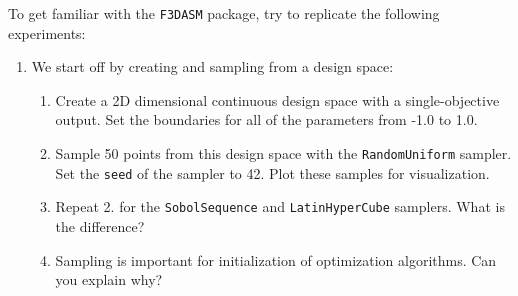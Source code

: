 \documentclass[10pt,a4paper,twoside]{article} %
\def\code#1{\texttt{#1}}
\begin{document}
To get familiar with the \code{F3DASM} package, try to replicate the following experiments:

\begin{enumerate}
	\setcounter{enumi}{0}
	\item We start off by creating and sampling from a design space:

	\begin{enumerate} [label*=\arabic*.]
		\item Create a 2D dimensional continuous design space with a single-objective output. Set the boundaries for all of the parameters from -1.0 to 1.0.
		
		\item Sample 50 points from this design space with the \code{RandomUniform} sampler. Set the \code{seed} of the sampler to 42. Plot these samples for visualization.
		
		\item Repeat 2. for the \code{SobolSequence} and \code{LatinHyperCube} samplers. What is the difference?
		
		\item Sampling is important for initialization of optimization algorithms. Can you explain why?
	\end{enumerate}
\end{enumerate}
\end{document}
